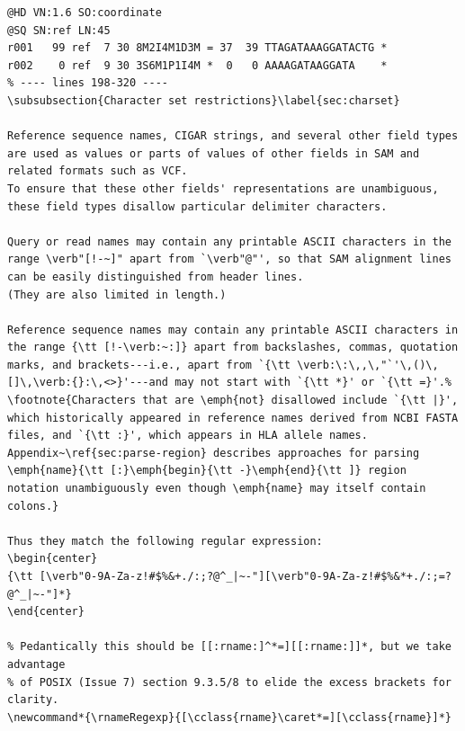 \begin{verbatim}
@HD VN:1.6 SO:coordinate
@SQ SN:ref LN:45
r001   99 ref  7 30 8M2I4M1D3M = 37  39 TTAGATAAAGGATACTG *
r002    0 ref  9 30 3S6M1P1I4M *  0   0 AAAAGATAAGGATA    *
% ---- lines 198-320 ----
\subsubsection{Character set restrictions}\label{sec:charset}

Reference sequence names, CIGAR strings, and several other field types are used as values or parts of values of other fields in SAM and related formats such as VCF.
To ensure that these other fields' representations are unambiguous, these field types disallow particular delimiter characters.

Query or read names may contain any printable ASCII characters in the range \verb"[!-~]" apart from `\verb"@"', so that SAM alignment lines can be easily distinguished from header lines.
(They are also limited in length.)

Reference sequence names may contain any printable ASCII characters in the range {\tt [!-\verb:~:]} apart from backslashes, commas, quotation marks, and brackets---i.e., apart from `{\tt \verb:\:\,,\,"`'\,()\,[]\,\verb:{}:\,<>}'---and may not start with `{\tt *}' or `{\tt =}'.%
\footnote{Characters that are \emph{not} disallowed include `{\tt |}', which historically appeared in reference names derived from NCBI FASTA files, and `{\tt :}', which appears in HLA allele names.
Appendix~\ref{sec:parse-region} describes approaches for parsing \emph{name}{\tt [:}\emph{begin}{\tt -}\emph{end}{\tt ]} region notation unambiguously even though \emph{name} may itself contain colons.}

Thus they match the following regular expression:
\begin{center}
{\tt [\verb"0-9A-Za-z!#$%&+./:;?@^_|~-"][\verb"0-9A-Za-z!#$%&*+./:;=?@^_|~-"]*}
\end{center}

% Pedantically this should be [[:rname:]^*=][[:rname:]]*, but we take advantage
% of POSIX (Issue 7) section 9.3.5/8 to elide the excess brackets for clarity.
\newcommand*{\rnameRegexp}{[\cclass{rname}\caret*=][\cclass{rname}]*}


\end{verbatim}

